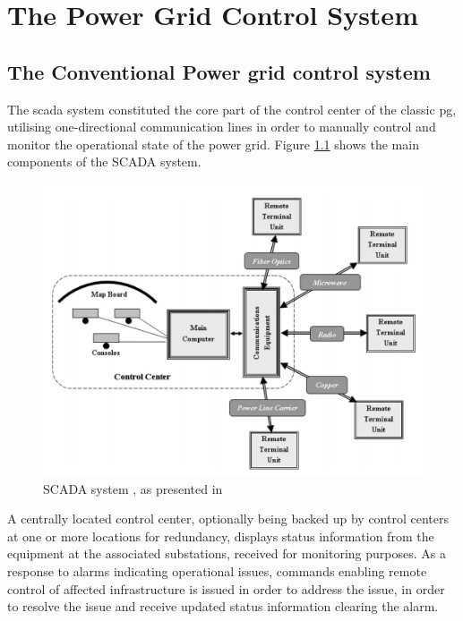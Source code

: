 \chapter{The Power Grid Control System}
\section{The Conventional Power grid control system}


The \acrshort{scada} system constituted the core part of the control center of the classic \acrlong{pg}, utilising one-directional communication lines in order to manually control and monitor the operational state of the power grid.
Figure \ref{fig:Blume-SCADA-system} shows the main components of the SCADA system.

\begin{figure}[ht]
\includegraphics[width=\linewidth]{figures/Blume-SCADA-system.png}
\caption[SCADA system]{SCADA system , as presented in \cite{BlumeStevenW2007Epsb}}
\label{fig:Blume-SCADA-system}
\end{figure}



A centrally located control center, optionally being backed up by control centers at one or more locations for redundancy, displays status information from the equipment at the associated substations, received for monitoring purposes. As a response to alarms indicating operational issues, commands enabling remote control of affected infrastructure is issued in order to address the issue, in order to resolve the issue and receive updated status information clearing the alarm. 




